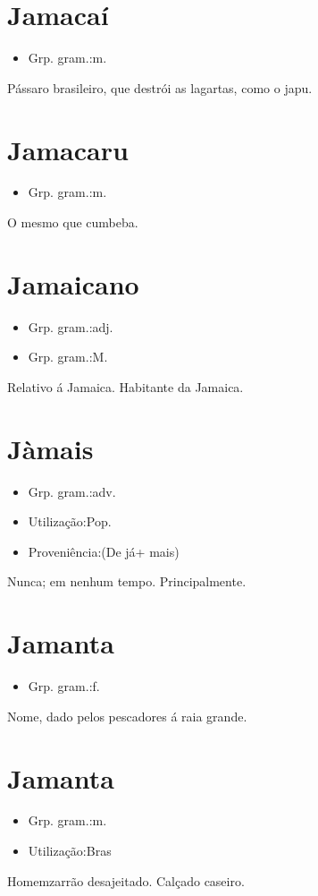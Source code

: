 \documentclass{article}
\begin{document}
\section{Jamacaí}
\begin{itemize}
\item {Grp. gram.:m.}
\end{itemize}
Pássaro brasileiro, que destrói as lagartas, como o japu.
\section{Jamacaru}
\begin{itemize}
\item {Grp. gram.:m.}
\end{itemize}
O mesmo que \textunderscore cumbeba\textunderscore .
\section{Jamaicano}
\begin{itemize}
\item {Grp. gram.:adj.}
\end{itemize}
\begin{itemize}
\item {Grp. gram.:M.}
\end{itemize}
Relativo á Jamaica.
Habitante da Jamaica.
\section{Jàmais}
\begin{itemize}
\item {Grp. gram.:adv.}
\end{itemize}
\begin{itemize}
\item {Utilização:Pop.}
\end{itemize}
\begin{itemize}
\item {Proveniência:(De \textunderscore já\textunderscore  + \textunderscore mais\textunderscore )}
\end{itemize}
Nunca; em nenhum tempo.
Principalmente.
\section{Jamanta}
\begin{itemize}
\item {Grp. gram.:f.}
\end{itemize}
Nome, dado pelos pescadores á raia grande.
\section{Jamanta}
\begin{itemize}
\item {Grp. gram.:m.}
\end{itemize}
\begin{itemize}
\item {Utilização:Bras}
\end{itemize}
Homemzarrão desajeitado.
Calçado caseiro.
\end{document}
